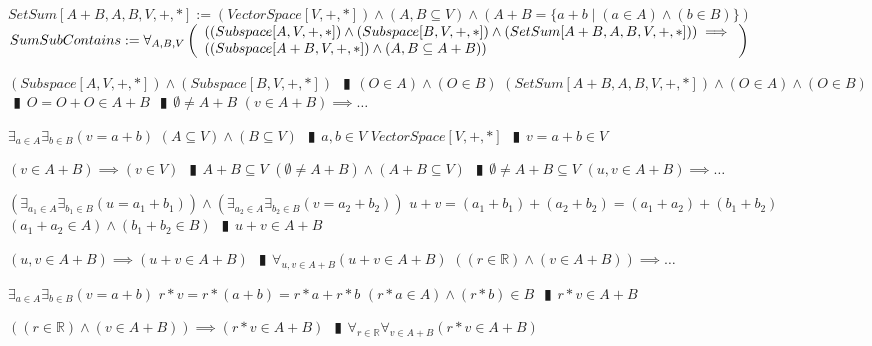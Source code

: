 \documentclass{book}
\newcommand{\abr}{:=}
\newcommand{\pipe}{$\phantom{(}\vrectangleblack\phantom{)}$}
\newcommand{\st}{\mathbin{|}}
\begin{document}
\begin{shaded} %
  $SetSum[A + B, A, B, V, +, *] \abr (VectorSpace[V, +, *]) \land (A, B \subseteq V) \land (A + B = \{a + b \st (a \in A) \land (b \in B)\})$ \\

  $SumSubContains \abr \forall_{A, B, V}\left(\begin{array}{ll}
    ((Subspace[A, V, +, *]) \land (Subspace[B, V, +, *]) \land (SetSum[A + B, A, B, V, +, *])) \hfill \implies \hfill \\
    ((Subspace[A + B, V, + ,*]) \land (A, B \subseteq A + B))
  \end{array}\right)$
  \begin{enumerate}
    \lit $(Subspace[A, V, +, *]) \land (Subspace[B, V, +, *])$ \pipe $(O \in A) \land (O \in B)$
    \lit $(SetSum[A + B, A, B, V, +, *]) \land (O \in A) \land (O \in B)$ \pipe $O = O + O \in A + B$ \pipe $\emptyset \neq A + B$
    \lit $(v \in A + B) \implies \ldots$
    \begin{enumerate}
      \lit $\exists_{a \in A} \exists_{b \in B}(v = a + b)$
      \lit $(A \subseteq V) \land (B \subseteq V)$ \pipe $a, b \in V$
      \lit $VectorSpace[V, +, *]$ \pipe $v = a + b \in V$
    \end{enumerate}
    \lit $(v \in A + B) \implies (v \in V)$ \pipe $A + B \subseteq V$
    \lit $(\emptyset \neq A + B) \land (A + B \subseteq V)$ \pipe $\emptyset \neq A + B \subseteq V$
    \lit $(u, v \in A + B) \implies \ldots$
    \begin{enumerate}
      \lit $(\exists_{a_1 \in A} \exists_{b_1 \in B}(u = a_1 + b_1)) \land (\exists_{a_2 \in A} \exists_{b_2 \in B}(v = a_2 + b_2))$
      \lit $u + v = (a_1 + b_1) + (a_2 + b_2) = (a_1 + a_2) + (b_1 + b_2)$
      \lit $(a_1 + a_2 \in A) \land (b_1 + b_2 \in B)$ \pipe $u + v \in A + B$
    \end{enumerate}
    \lit $(u, v \in A + B) \implies (u + v \in A + B)$ \pipe $\forall_{u, v \in A + B}(u + v \in A + B)$
    \lit $((r \in \mathbb{R}) \land (v \in A + B)) \implies \ldots$
    \begin{enumerate}
      \lit $\exists_{a \in A} \exists_{b \in B}(v = a + b)$
      \lit $r * v = r * (a + b) = r * a + r * b$
      \lit $(r * a \in A) \land (r * b) \in B$ \pipe $r * v \in A + B$
    \end{enumerate}
    \lit $((r \in \mathbb{R}) \land (v \in A + B)) \implies (r * v \in A + B)$ \pipe $\forall_{r \in \mathbb{R}} \forall_{v \in A + B}(r * v \in A + B)$

\end{enumerate}
\end{shaded}
\end{document}
